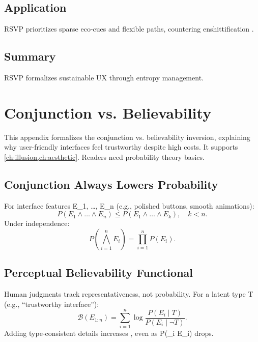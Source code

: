 \documentclass[openany]{book}
\begin{document}
\section{Application}
\label{sec:rsvp-application}
RSVP prioritizes sparse eco-cues and flexible paths, countering enshittification \citep{doctorow2022}.

\section{Summary}
RSVP formalizes sustainable UX through entropy management.

\chapter{Conjunction vs. Believability}
\label{app:conjunction}

This appendix formalizes the conjunction vs. believability inversion, explaining why user-friendly interfaces feel trustworthy despite high costs. It supports \cref{ch:illusion,ch:aesthetic}. Readers need probability theory basics.

\section{Conjunction Always Lowers Probability}
\label{sec:conj-prob}
For interface features E_1, \dots, E_n (e.g., polished buttons, smooth animations):
\begin{equation}
\label{eq:conj-prob}
P(E_1 \land \dots \land E_n) \leq P(E_1 \land \dots \land E_k), \quad k < n.
\end{equation}
Under independence:
\begin{equation}
\label{eq:conj-indep}
P(\bigwedge_{i=1}^n E_i) = \prod_{i=1}^n P(E_i).
\end{equation}

\section{Perceptual Believability Functional}
\label{sec:conj-believability}
Human judgments track representativeness, not probability. For a latent type T (e.g., \textquotedblleft trustworthy interface\textquotedblright):
\begin{equation}
\label{eq:believability-functional}
\mathcal{B}(E_{1:n}) = \sum_{i=1}^n \log \frac{P(E_i \mid T)}{P(E_i \mid \neg T)}.
\end{equation}
Adding type-consistent details increases , even as P(\bigwedge_i E_i) drops.
\end{document}
